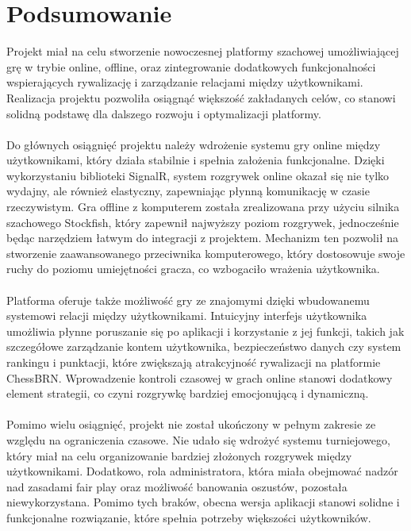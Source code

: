 \documentclass[twoside]{projektInzynierskiMS1}
\begin{document}
\section{Podsumowanie}

\noindent
Projekt miał na celu stworzenie nowoczesnej platformy szachowej umożliwiającej grę w trybie online, offline, oraz zintegrowanie dodatkowych funkcjonalności wspierających rywalizację i zarządzanie relacjami między użytkownikami. Realizacja projektu pozwoliła osiągnąć większość zakładanych celów, co stanowi solidną podstawę dla dalszego rozwoju i optymalizacji platformy.
\\\\
Do głównych osiągnięć projektu należy wdrożenie systemu gry online między użytkownikami, który działa stabilnie i spełnia założenia funkcjonalne. Dzięki wykorzystaniu biblioteki SignalR, system rozgrywek online okazał się nie tylko wydajny, ale również elastyczny, zapewniając płynną komunikację w czasie rzeczywistym. Gra offline z komputerem została zrealizowana przy użyciu silnika szachowego Stockfish, który zapewnił najwyższy poziom rozgrywek, jednocześnie będąc narzędziem łatwym do integracji z projektem. Mechanizm ten pozwolił na stworzenie zaawansowanego przeciwnika komputerowego, który dostosowuje swoje ruchy do poziomu umiejętności gracza, co wzbogaciło wrażenia użytkownika.
\\\\
Platforma oferuje także możliwość gry ze znajomymi dzięki wbudowanemu systemowi relacji między użytkownikami. Intuicyjny interfejs użytkownika umożliwia płynne poruszanie się po aplikacji i korzystanie z jej funkcji, takich jak szczegółowe zarządzanie kontem użytkownika, bezpieczeństwo danych czy system rankingu i punktacji, które zwiększają atrakcyjność rywalizacji na platformie ChessBRN. Wprowadzenie kontroli czasowej w grach online stanowi dodatkowy element strategii, co czyni rozgrywkę bardziej emocjonującą i dynamiczną.
\\\\
Pomimo wielu osiągnięć, projekt nie został ukończony w pełnym zakresie ze względu na ograniczenia czasowe. Nie udało się wdrożyć systemu turniejowego, który miał na celu organizowanie bardziej złożonych rozgrywek między użytkownikami. Dodatkowo, rola administratora, która miała obejmować nadzór nad zasadami fair play oraz możliwość banowania oszustów, pozostała niewykorzystana. Pomimo tych braków, obecna wersja aplikacji stanowi solidne i funkcjonalne rozwiązanie, które spełnia potrzeby większości użytkowników.
\end{document}
